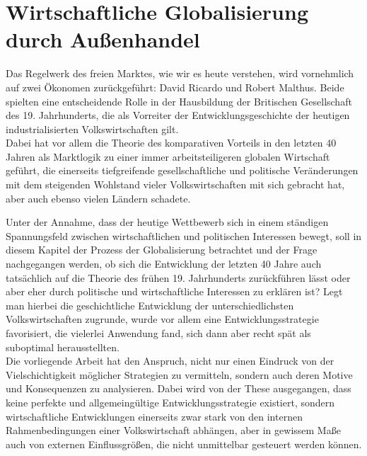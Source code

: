 
\chapter{Wirtschaftliche Globalisierung durch Au{\ss}enhandel}\label{sec:Globalisierung}
Das Regelwerk des freien Marktes, wie wir es heute verstehen, wird vornehmlich auf zwei Ökonomen zurückgeführt: David Ricardo und Robert Malthus. Beide spielten eine entscheidende Rolle in der Hausbildung der Britischen Gesellschaft des 19. Jahrhunderts, die als Vorreiter der Entwicklungsgeschichte der heutigen industrialisierten Volkswirtschaften gilt.\\
Dabei hat vor allem die Theorie des komparativen Vorteils in den letzten 40 Jahren als Marktlogik zu einer immer arbeitsteiligeren globalen Wirtschaft geführt, die einerseits tiefgreifende gesellschaftliche und politische Veränderungen mit dem steigenden Wohlstand vieler Volkswirtschaften mit sich gebracht hat, aber auch ebenso vielen Ländern schadete.\newline


Unter der Annahme, dass der heutige Wettbewerb sich in einem ständigen Spannungsfeld zwischen wirtschaftlichen und politischen Interessen bewegt, soll in diesem Kapitel der Prozess der Globalisierung betrachtet und der Frage nachgegangen werden, ob sich die Entwicklung der letzten 40 Jahre auch tatsächlich auf die Theorie des frühen 19. Jahrhunderts zurückführen lässt oder aber eher durch politische und wirtschaftliche Interessen zu erklären ist? \newline
Legt man hierbei die geschichtliche Entwicklung der unterschiedlichsten Volkswirtschaften zugrunde, wurde vor allem eine Entwicklungsstrategie favorisiert, die vielerlei Anwendung fand, sich dann aber recht spät als suboptimal herausstellten.\\ 
Die vorliegende Arbeit hat den Anspruch, nicht nur einen Eindruck von der Vielschichtigkeit möglicher Strategien zu vermitteln, sondern auch deren Motive und Konsequenzen zu analysieren. Dabei wird von der These ausgegangen, dass keine perfekte und allgemeingültige Entwicklungsstrategie existiert, sondern wirtschaftliche Entwicklungen einerseits zwar stark von den internen Rahmenbedingungen einer Volkswirtschaft abhängen, aber in gewissem Ma{\ss}e auch von externen Einflussgrö{\ss}en, die nicht unmittelbar gesteuert werden können.\\


